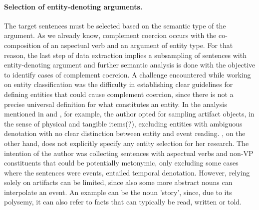 \documentclass{article}
\begin{document}
\paragraph{Selection of entity-denoting arguments.} The target sentences must be selected based on the semantic type of the argument. As we already know, complement coercion occurs with the co-composition of an aspectual verb and an argument of entity type. For that reason, the last step of data extraction implies a subsampling of sentences with entity-denoting argument and further semantic analysis is done with the objective to identify cases of complement coercion. 
A challenge encountered while working on entity classification was the difficulty in establishing clear guidelines for defining entities that could cause complement coercion, since there is not a precise universal definition for what constitutes an entity. In the analysis mentioned in \textcite{rud_covert_2011} and \textcite{zarcone_logical_2012}, for example, the author opted for sampling artifact objects, in the sense of physical and tangible %
items(?), excluding entities with ambiguous denotation with no clear distinction between entity and event reading. %
\textcite{verspoor_conventionality-governed_1997}, on the other hand, does not explicitly specify any
entity selection for her research. The intention of the author was collecting sentences with aspectual verbs and non-VP constituents that could be potentially metonymic, only excluding some cases where the sentences were events, entailed temporal denotation.
However, relying solely on artifacts can be limited, since also some more abstract nouns can interpolate an event. An example can be the noun 'story', since, due to its polysemy, it can also refer to facts that can typically be read, written or told. %
\end{document}
